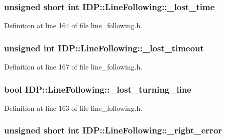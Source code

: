 \hypertarget{classIDP_1_1LineFollowing_acc5f7d1d33c49ae1be9de702122aac02}{
\subsubsection[{\_\-lost\_\-time}]{\setlength{\rightskip}{0pt plus 5cm}unsigned short int {\bf IDP::LineFollowing::\_\-lost\_\-time}}}
\label{classIDP_1_1LineFollowing_acc5f7d1d33c49ae1be9de702122aac02}


Definition at line 164 of file line\_\-following.h.

\hypertarget{classIDP_1_1LineFollowing_a93b2293cd1f5fe2795b0cca37b38f403}{
\subsubsection[{\_\-lost\_\-timeout}]{\setlength{\rightskip}{0pt plus 5cm}unsigned int {\bf IDP::LineFollowing::\_\-lost\_\-timeout}}}
\label{classIDP_1_1LineFollowing_a93b2293cd1f5fe2795b0cca37b38f403}


Definition at line 167 of file line\_\-following.h.

\hypertarget{classIDP_1_1LineFollowing_a76fe578bf4bbd847e74bb1b9bfab7149}{
\subsubsection[{\_\-lost\_\-turning\_\-line}]{\setlength{\rightskip}{0pt plus 5cm}bool {\bf IDP::LineFollowing::\_\-lost\_\-turning\_\-line}}}
\label{classIDP_1_1LineFollowing_a76fe578bf4bbd847e74bb1b9bfab7149}


Definition at line 163 of file line\_\-following.h.

\hypertarget{classIDP_1_1LineFollowing_ac74d1f91775296a217ff1aa4ecf00ae9}{
\subsubsection[{\_\-right\_\-error}]{\setlength{\rightskip}{0pt plus 5cm}unsigned short int {\bf IDP::LineFollowing::\_\-right\_\-error}}}
\label{classIDP_1_1LineFollowing_ac74d1f91775296a217ff1aa4ecf00ae9}


